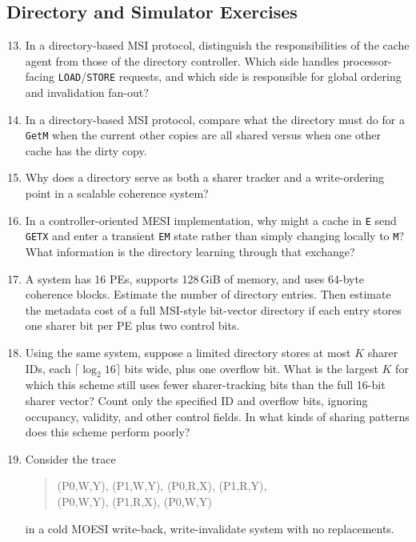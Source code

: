 \subsection*{Directory and Simulator Exercises}
\begin{enumerate}
    \setcounter{enumi}{12}
    \setlength{\itemsep}{0.45em}
    \item In a directory-based MSI protocol, distinguish the responsibilities of the cache agent from those of the directory controller.
    Which side handles processor-facing \texttt{LOAD}/\texttt{STORE} requests, and which side is responsible for global ordering and invalidation fan-out?
    \item In a directory-based MSI protocol, compare what the directory must do for a \texttt{GetM} when the current other copies are all shared versus when one other cache has the dirty copy.
    \item Why does a directory serve as both a sharer tracker and a write-ordering point in a scalable coherence system?
    \item In a controller-oriented MESI implementation, why might a cache in \texttt{E} send \texttt{GETX} and enter a transient \texttt{EM} state rather than simply changing locally to \texttt{M}? What information is the directory learning through that exchange?
    \item A system has 16 PEs, supports 128\,GiB of memory, and uses 64-byte coherence blocks.
    Estimate the number of directory entries.
    Then estimate the metadata cost of a full MSI-style bit-vector directory if each entry stores one sharer bit per PE plus two control bits.
    \item Using the same system, suppose a limited directory stores at most $K$ sharer IDs, each $\lceil \log_2 16\rceil$ bits wide, plus one overflow bit.
    What is the largest $K$ for which this scheme still uses fewer sharer-tracking bits than the full 16-bit sharer vector?
    Count only the specified ID and overflow bits, ignoring occupancy, validity, and other control fields.
    In what kinds of sharing patterns does this scheme perform poorly?
    \item Consider the trace
    \begin{quote}
                \ttfamily
                (P0,W,Y), (P1,W,Y), (P0,R,X), (P1,R,Y),\\
        (P0,W,Y), (P1,R,X), (P0,W,Y)
    \end{quote}
    in a cold MOESI write-back, write-invalidate system with no replacements.

\end{enumerate}
